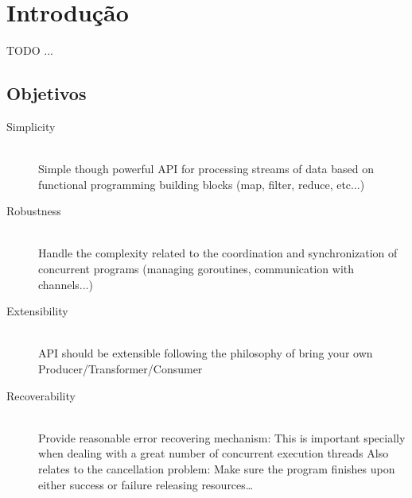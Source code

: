 \chapter{Introdução}
\label{cha:introduction}

TODO ...

\section{Objetivos}
\label{sec:objectives}

\begin{description}
  \item[Simplicity] \hfill \\
  Simple though powerful API for processing streams of data based on functional programming building blocks (map, filter, reduce, etc...)
  \item[Robustness] \hfill \\
  Handle the complexity related to the coordination and synchronization of concurrent programs (managing goroutines, communication with channels...)
  \item[Extensibility] \hfill \\
  API should be extensible following the philosophy of bring your own Producer/Transformer/Consumer
  \item[Recoverability] \hfill \\
  Provide reasonable error recovering mechanism: This is important specially when dealing with a great number of concurrent execution threads
  Also relates to the cancellation problem: Make sure the program finishes upon either success or failure releasing resources\ldots
\end{description}
